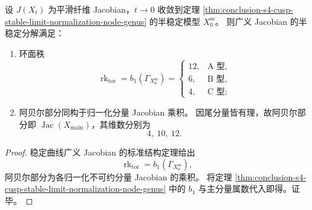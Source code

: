 \begin{corollary}\label{cor:conclusion-s4-cusp-jacobian-toric-rank-abelian-dimension}
设 \(J(X_t)\) 为平滑纤维 Jacobian，\(t\to 0\) 收敛到定理
\ref{thm:conclusion-s4-cusp-stable-limit-normalization-node-genus} 的半稳定模型 \(X_0^{\mathrm{ss}}\)。
则广义 Jacobian 的半稳定分解满足：
\begin{enumerate}
  \item 环面秩
  \[
  \operatorname{rk}_{\mathrm{tor}}=b_1(\Gamma_{X_0^{\mathrm{ss}}})=
  \begin{cases}
  12,&\text{A 型},\\
  6,&\text{B 型},\\
  4,&\text{C 型};
  \end{cases}
  \]
  \item 阿贝尔部分同构于归一化分量 Jacobian 乘积。
  因尾分量皆有理，故阿贝尔部分即 \(\operatorname{Jac}(X_{\mathrm{main}})\)，其维数分别为
  \[
  4,\ 10,\ 12.
  \]
\end{enumerate}
\end{corollary}
\begin{proof}
稳定曲线广义 Jacobian 的标准结构定理给出
\[
\operatorname{rk}_{\mathrm{tor}}=b_1(\Gamma_{X_0^{\mathrm{ss}}}),
\]
阿贝尔部分为各归一化不可约分量 Jacobian 的乘积。
将定理
\ref{thm:conclusion-s4-cusp-stable-limit-normalization-node-genus}
中的 \(b_1\) 与主分量属数代入即得。证毕。
\end{proof}



